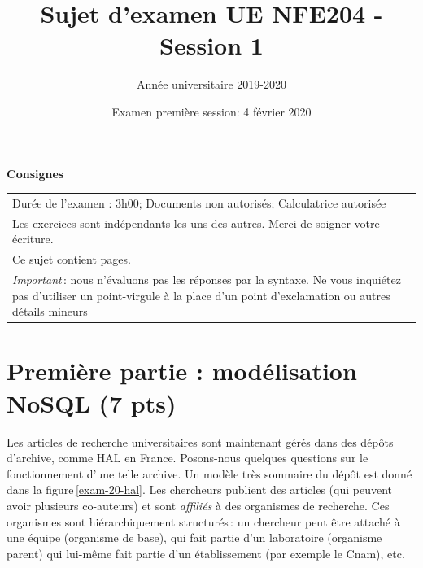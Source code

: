 \documentclass[11pt,a4paper]{article}
\begin{document}
\title{Sujet d'examen UE NFE204 - Session 1}
\author{Année universitaire 2019-2020}
\date{Examen première session: 4 février 2020}

\maketitle

\begin{center}
{\bf \Large Consignes}\\
\begin{tabular}{| p{15cm} |}
\hline
Dur\'ee de l'examen : 3h00; Documents non autoris\'es;  Calculatrice autoris\'ee\\

Les exercices sont indépendants les uns des autres. Merci de soigner votre écriture.\\
Ce sujet contient \pageref{LastPage} pages.\\

\textit{Important}\,: nous n'évaluons pas les réponses par la syntaxe. Ne vous
inquiétez pas d'utiliser un point-virgule à la place d'un point d'exclamation ou
autres détails mineurs
\\
\hline
\end{tabular}
\end{center}



\section*{Première partie : modélisation NoSQL (7 pts)}

Les articles de recherche universitaires sont maintenant gérés dans des dépôts
d'archive, comme HAL en France. Posons-nous quelques questions sur le fonctionnement
d'une telle archive.
Un modèle très sommaire du dépôt est donné dans la figure\,\ref{exam-20-hal}. Les chercheurs
publient des articles (qui peuvent avoir plusieurs co-auteurs) et sont \emph{affiliés} à des organismes
de recherche. Ces organismes sont hiérarchiquement structurés\,: un chercheur peut être 
attaché à une équipe (organisme de base), qui fait partie d'un laboratoire (organisme
parent) qui lui-même fait partie d'un établissement (par exemple le Cnam), etc.
\end{document}
